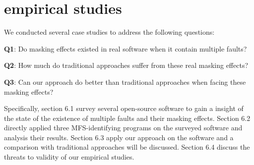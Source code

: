 \documentclass{sig-alternate}
\begin{document}
%
%

\section{empirical studies}
We conducted several case studies to address the following questions:

\textbf{Q1}: Do masking effects existed in real software when it contain multiple faults?

\textbf{Q2}: How much do traditional approaches suffer from these real masking effects?

\textbf{Q3}: Can our approach do better than traditional approaches when facing these masking effects?

Specifically, section 6.1 survey several open-source software to gain a insight of the state of the existence of multiple faults and their masking effects. Section 6.2 directly applied three MFS-identifying programs on the surveyed software and analysis their results. Section 6.3 apply our approach on the software and a comparison with traditional approaches will be discussed. Section 6.4 discuss the threats to validity of our empirical studies.
\end{document}
